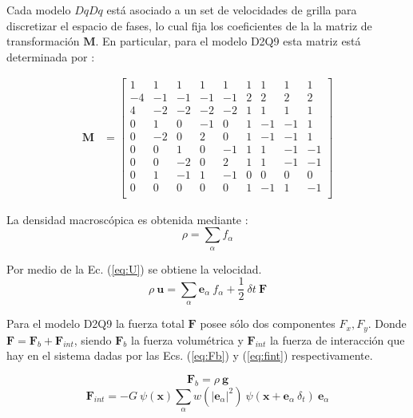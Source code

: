 Cada modelo $DqDq$ está asociado a un set de velocidades de grilla para discretizar el espacio de fases, lo cual fija los coeficientes de la la matriz de transformación $\mathbf{M}$. En particular, para el modelo D2Q9 esta matriz está determinada por \cite{kruger2017lattice}:


\begin{align}
\mathbf{M} & =
\begin{bmatrix}
1 & 1 & 1 & 1 & 1 & 1 & 1 & 1 & 1 \\
-4 &-1 &-1 &-1 &-1 & 2 & 2 & 2 & 2 \\
4 &-2 &-2 &-2 &-2 & 1 & 1 & 1 & 1 \\
0 & 1 & 0 &-1 & 0 & 1 &-1 &-1 & 1 \\
0 &-2 & 0 & 2 & 0 & 1 &-1 &-1 & 1 \\
0 & 0 & 1 & 0 &-1 & 1 & 1 &-1 &-1 \\
0 & 0 &-2 & 0 & 2 & 1 & 1 &-1 &-1 \\
0 & 1 &-1 & 1 &-1 & 0 & 0 & 0 & 0 \\    
0 & 0 & 0 & 0 & 0 & 1 &-1 & 1 &-1 \\        
\end{bmatrix}
\label{eq:matriz_m}
\end{align}

La densidad macroscópica es obtenida mediante :
\begin{equation}
        \rho = \sum_{\alpha} f_{\alpha}
        \label{eq:rho}
\end{equation}

Por medio de la Ec. (\ref{eq:U}) se obtiene la velocidad.
\begin{equation}
    \rho \> \mathbf{u} = \sum_{\alpha} {\mathbf{e}}_{\alpha} \> f_{\alpha} + \frac{1}{2} \> {\delta}{t} \> \mathbf{F}
    \label{eq:U}
\end{equation}

Para el modelo D2Q9 la fuerza total $\mathbf{F}$ posee sólo dos componentes $F_{x} , F_{y}$. Donde $ {\mathbf{F}} = {\mathbf{F}}_{b} + {\mathbf{F}}_{int} $, siendo ${\mathbf{F}}_{b}$ la fuerza volumétrica y ${\mathbf{F}}_{int}$ la fuerza de interacción que hay en el sistema dadas por las Ecs. (\ref{eq:Fb}) y (\ref{eq:fint}) respectivamente.

\begin{equation}
	{\mathbf{F}}_{b} = \rho \> \mathbf{g}
	\label{eq:Fb}
\end{equation}
\begin{equation}
{\mathbf{F}}_{int} = - G \> \psi(\mathbf{x}) \sum_{\alpha}^{} w({|{\mathbf{e}}_{\alpha}|}^{2}) \> \psi (\mathbf{x} + {\mathbf{e}}_{\alpha} \> \delta_{t}) \> {\mathbf{e}}_{\alpha} 
\label{eq:fint}
\end{equation}


